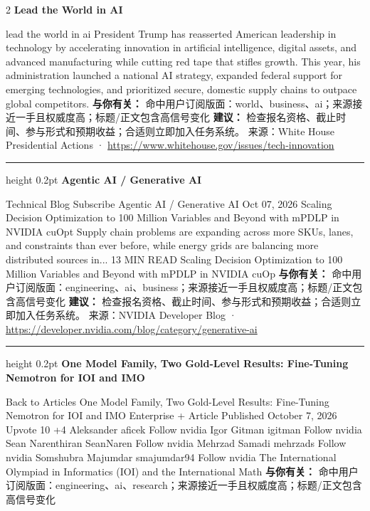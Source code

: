 \documentclass[10.5pt]{ctexart}
\begin{document}
\begin{multicols}{2}
{\large\bfseries Lead the World in AI}\par
lead the world in ai President Trump has reasserted American leadership in technology by accelerating innovation in artificial intelligence, digital assets, and advanced manufacturing while cutting red tape that stifles growth. This year, his administration launched a national AI strategy, expanded federal support for emerging technologies, and prioritized secure, domestic supply chains to outpace global competitors.
\textbf{与你有关：} 命中用户订阅版面：world、business、ai；来源接近一手且权威度高；标题/正文包含高信号变化
\textbf{建议：} 检查报名资格、截止时间、参与形式和预期收益；合适则立即加入任务系统。
{\footnotesize\color{ormuted} 来源：White House Presidential Actions · \url{https://www.whitehouse.gov/issues/tech-innovation}}
\vspace{2mm}
\hrule height 0.2pt
\vspace{2mm}
{\large\bfseries Agentic AI / Generative AI}\par
Technical Blog Subscribe Agentic AI / Generative AI Oct 07, 2026 Scaling Decision Optimization to 100 Million Variables and Beyond with mPDLP in NVIDIA cuOpt Supply chain problems are expanding across more SKUs, lanes, and constraints than ever before, while energy grids are balancing more distributed sources in... 13 MIN READ Scaling Decision Optimization to 100 Million Variables and Beyond with mPDLP in NVIDIA cuOp
\textbf{与你有关：} 命中用户订阅版面：engineering、ai、business；来源接近一手且权威度高；标题/正文包含高信号变化
\textbf{建议：} 检查报名资格、截止时间、参与形式和预期收益；合适则立即加入任务系统。
{\footnotesize\color{ormuted} 来源：NVIDIA Developer Blog · \url{https://developer.nvidia.com/blog/category/generative-ai}}
\vspace{2mm}
\hrule height 0.2pt
\vspace{2mm}
{\large\bfseries One Model Family, Two Gold-Level Results: Fine-Tuning Nemotron for IOI and IMO}\par
Back to Articles One Model Family, Two Gold-Level Results: Fine-Tuning Nemotron for IOI and IMO Enterprise + Article Published October 7, 2026 Upvote 10 +4 Aleksander aficek Follow nvidia Igor Gitman igitman Follow nvidia Sean Narenthiran SeanNaren Follow nvidia Mehrzad Samadi mehrzads Follow nvidia Somshubra Majumdar smajumdar94 Follow nvidia The International Olympiad in Informatics (IOI) and the International Math
\textbf{与你有关：} 命中用户订阅版面：engineering、ai、research；来源接近一手且权威度高；标题/正文包含高信号变化

\end{multicols}
\end{document}
